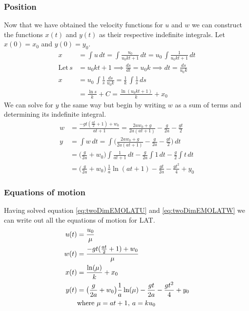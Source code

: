 \documentclass[%
aip,
jmp,
amsmath,amssymb,
reprint,%
]{revtex4-1}
\newcommand{\comma}{\hspace{0.1mm},\hspace{0.7mm}}
\begin{document}
	\subsubsection{Position}
	Now that we have obtained the velocity functions for $u$ and $w$ we can construct the functions $x(t)$ and $y(t)$ as their respective indefinite integrals. Let $x(0) = x_0$ and $y(0) = y_0$.
	\begin{align}\nonumber
		x &= \int u\,dt = \int \frac{u_0}{u_0kt+1}\,dt = u_0\,\int\frac{1}{u_0kt+1}\,dt\\\nonumber
	\mathrm{Let }\,s &= u_0kt+1 \implies \frac{ds}{dt} = u_0k \implies dt = \frac{ds}{u_0k}\\\nonumber
		x &= u_0\,\int\frac{1}{s}\,\frac{ds}{u_0k} = \frac{1}{k}\,\int\frac{1}{s}\,ds\\\nonumber
		&= \frac{\ln s}{k} + C = \frac{\ln(u_0kt+1)}{k} + x_0
	\end{align}
	We can solve for $y$ the same way but begin by writing $w$ as a sum of terms and determining its indefinite integral.
	\begin{align}\nonumber
		w &= \frac{-gt(\frac{at}{2}+1)+w_0}{at+1} = \frac{2aw_0+g}{2a(at+1)}-\frac{g}{2a}-\frac{gt}{2}\\\nonumber
		y &= \int w\,dt = \int \Big(\frac{2aw_0+g}{2a(at+1)}-\frac{g}{2a}-\frac{gt}{2}\Big)\,dt \\\nonumber
		&=\big(\frac{g}{2a}+w_0\big)\int\frac{1}{at+1}\,dt -\frac{g}{2a}\int 1\,dt -\frac{g}{2}\int t\,dt\\\nonumber
		&=\big(\frac{g}{2a}+w_0\big)\,\frac{1}{a}\ln(at+1) -\frac{gt}{2a}-\frac{gt^2}{4}+y_0
	\end{align}
	\subsubsection{Equations of motion}
	Having solved equation \eqref{eq:twoDimEMOLATU} and \eqref{eq:twoDimEMOLATW} we can write out all the equations of motion for LAT.
	\begin{align*}\nonumber
		u(t) &= \frac{u_0}{\mu}\\\nonumber
		w(t) &= \frac{-gt(\frac{at}{2}+1)+w_0}{\mu}\\\nonumber
		x(t) &= \frac{\ln(\mu)}{k} + x_0\\\nonumber
		y(t) &= \big(\frac{g}{2a}+w_0\big)\frac{1}{a}\ln(\mu) -\frac{gt}{2a}-\frac{gt^2}{4}+y_0\\\nonumber
		&\mathrm{where}\,\,\mu = at+1 \comma a = ku_0
	\end{align*}
\end{document}
